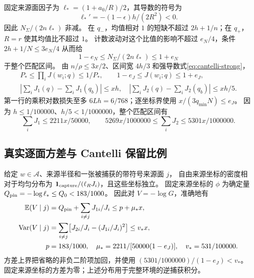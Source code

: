 \documentclass[UTF8,a4paper,11pt,fontset=fandol]{ctexart}
\theoremstyle{remark}
\newcommand{\one}{\mathbf 1}
\begin{document}
固定来源面因子为 $\ell_*=(1+a_0/R)/2$，其导数的符号为
\[
 \ell_*'=-(1-\epsilon)h/(2R^2)<0.
\]
因此 $N_\Sigma/(2n\ell_*)$ 非减。
在 $q_-$，均值相对 $1$ 的短缺不超过 $2h+1/n$；在 $q_+$，$R=r$ 使其均值比不超过 $1$。
计数波动对这个比值的影响不超过 $e_N/4$，条件 $2h+1/N\le3e_N/4$ 从而给
\[
 1-e_N\le N_\Sigma/(2n\ell_*)\le1+e_N
\]
于整个匹配区间。
由 $n/\rho\le3x/2$、区间宽 $4h/3$ 和强导数式\eqref{eq:cantelli-strong}，
\begin{equation}\label{eq:cantelli-bridges}
\begin{gathered}
 P_*\le\prod_iJ(w_i;q)\le1/P_*,\qquad
 1-e_J\le J(w_i;q)\le1+e_J,\\
 \left|\sum_iJ_1(q)-\sum_iJ_1(q_b)\right|\le xh,\quad
 \left|\sum_iJ_2(q)-\sum_iJ_2(q_b)\right|\le xh/5.
\end{gathered}
\end{equation}
第一行的乘积对数损失至多 $6Lh=6/768$；逐坐标界使用 $x/(3q_{\min}N)\le e_J$。
因为 $h\le1/100000$、$h/5<1/1000000$，整个匹配区间有
\begin{equation}\label{eq:cantelli-wholeprofiles}
 \sum_iJ_1\le2211x/50000,\qquad
 5269x/1000000\le\sum_iJ_2\le5301x/1000000.
\end{equation}

\subsection{真实逐面方差与 Cantelli 保留比例}\label{subsec:cantelli-retention}
给定 $w\in\mathcal A$、来源半径和一张被捕获的带符号来源面 $j$，
自由来源坐标的密度相对于均匀分布为
$\one_{\rm capture}/(\ell_RJ_i)$，且这些坐标独立。
固定来源坐标的 $\phi$ 为确定量 $Q_{\rm pin}=-\log\ell_*\le Q_0<183/1000$。
因此对 $V=-\log G$，准确地有
\begin{align*}
 \mathbb E(V\mid j)&=Q_{\rm pin}+\sum_{i\ne j}J_{1i}/J_i\le p+\mu_*x,\\
 \operatorname{Var}(V\mid j)&=
 \sum_{i\ne j}\bigl[J_{2i}/J_i-(J_{1i}/J_i)^2\bigr]\le v_*x,\\
 p&=183/1000,\quad \mu_*=2211/[50000(1-e_J)],\quad v_*=531/100000.
\end{align*}
方差上界把省略的非负二阶项加回，并使用
$(5301/1000000)/(1-e_J)<v_*$。
固定来源坐标的方差为零；上述分布用于完整环境的逆捕获积分。
\end{document}
